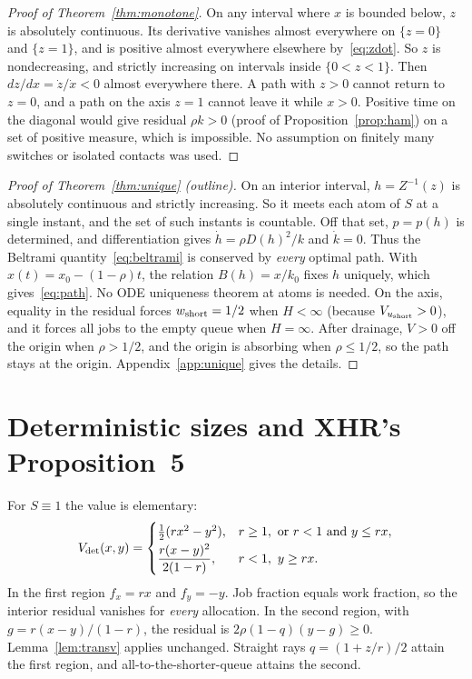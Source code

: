 \documentclass[11pt]{article}
\numberwithin{equation}{section}
\theoremstyle{definition}
\theoremstyle{remark}
\begin{document}
\begin{proof}[Proof of Theorem~\ref{thm:monotone}]
On any interval where $x$ is bounded below, $z$ is absolutely continuous. Its derivative vanishes almost everywhere on $\{z=0\}$ and $\{z=1\}$, and is positive almost everywhere elsewhere by~\eqref{eq:zdot}. So $z$ is nondecreasing, and strictly increasing on intervals inside $\{0<z<1\}$. Then $dz/dx=\dot z/\dot x<0$ almost everywhere there. A path with $z>0$ cannot return to $z=0$, and a path on the axis $z=1$ cannot leave it while $x>0$. Positive time on the diagonal would give residual $\rho k>0$ (proof of Proposition~\ref{prop:ham}) on a set of positive measure, which is impossible. No assumption on finitely many switches or isolated contacts was used.
\end{proof}

\begin{proof}[Proof of Theorem~\ref{thm:unique} (outline)]
On an interior interval, $h=Z^{-1}(z)$ is absolutely continuous and strictly increasing. So it meets each atom of $S$ at a single instant, and the set of such instants is countable. Off that set, $p=p(h)$ is determined, and differentiation gives $\dot h=\rho D(h)^2/k$ and $\dot k=0$. Thus the Beltrami quantity~\eqref{eq:beltrami} is conserved by \emph{every} optimal path. With $x(t)=x_0-(1-\rho)t$, the relation $B(h)=x/k_0$ fixes $h$ uniquely, which gives~\eqref{eq:path}. No ODE uniqueness theorem at atoms is needed. On the axis, equality in the residual forces $w_{\rm short}=1/2$ when $H<\infty$ (because $V_{u_{\rm short}}>0$), and it forces all jobs to the empty queue when $H=\infty$. After drainage, $V>0$ off the origin when $\rho>1/2$, and the origin is absorbing when $\rho\le1/2$, so the path stays at the origin. Appendix~\ref{app:unique} gives the details.
\end{proof}

\section{Deterministic sizes and XHR's Proposition~5}\label{sec:det}

For $S\equiv1$ the value is elementary:
\begin{equation}\label{eq:Vdet}
V_{\rm det}(x,y)=\begin{cases}\tfrac12(rx^2-y^2),& r\ge1,\ \text{or } r<1\text{ and }y\le rx,\\[0.5ex] \dfrac{r(x-y)^2}{2(1-r)},& r<1,\ y\ge rx.\end{cases}
\end{equation}
In the first region $f_x=rx$ and $f_y=-y$. Job fraction equals work fraction, so the interior residual vanishes for \emph{every} allocation. In the second region, with $g=r(x-y)/(1-r)$, the residual is $2\rho(1-q)(y-g)\ge0$. Lemma~\ref{lem:transv} applies unchanged. Straight rays $q=(1+z/r)/2$ attain the first region, and all-to-the-shorter-queue attains the second.
\end{document}
